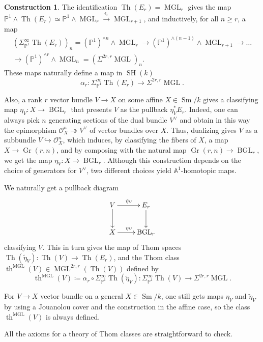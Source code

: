 \documentclass[10pt]{amsart}
\theoremstyle{definition}
\newtheorem{constr}[defn]{Construction}
\theoremstyle{plain}
\numberwithin{equation}{section}
\newcommand{\0}{\emptyset}
\newcommand{\A}{{\mathbb A}}
\renewcommand{\P}{{\mathbb P}}
\newcommand{\MGL}{{\operatorname{MGL}}}
\newcommand{\BGL}{{\operatorname{BGL}}}
\newcommand{\Gr}{{\operatorname{Gr}}}
\newcommand{\SH}{{\operatorname{SH}}}
\newcommand{\Th}{{\operatorname{Th}}}
\newcommand{\Sm}{{\operatorname{Sm}}}
\renewcommand{\th}{{\operatorname{th}}}
\begin{document}
\begin{constr}
\label{constr:MGLthomclasses}
The identification $\Th(E_r) = \MGL_r$ gives the map $\P^1 \wedge \Th(E_r) \simeq \P^1 \wedge \MGL_r \xrightarrow{\epsilon_r} \MGL_{r+1}$, and inductively, for all $n \ge r$, a map
\begin{multline*}
    (\Sigma_{\P^1}^\infty \Th(E_r))_n= (\P^1)^{\wedge n} \wedge \MGL_r \to (\P^1)^{\wedge (n-1)}\wedge \MGL_{r+1} \to \ldots \\ \to (\P^1)^{\wedge r} \wedge \MGL_n= (\Sigma^{2r,r}\MGL)_n.
\end{multline*}
These maps naturally define a map in $\SH(k)$
\begin{equation}
\label{eq:universalmapsMGL}
    \alpha_r: \Sigma_{\P^1}^\infty\Th(E_r)\to \Sigma^{2r,r}\MGL.
\end{equation}

Also, a rank $r$ vector bundle $V\to X$ on  some affine $X\in \Sm/k$ gives a classifying map $\eta_V:X\to \BGL_r$ that presents $V$ as the pullback $\eta_V^* E_r$. Indeed, one can always pick $n$ generating sections of the dual bundle $V^\vee$ and obtain in this way the epimorphism $\mathcal{O}_X^n \twoheadrightarrow V^\vee$ of vector bundles over $X$. Thus, dualizing gives $V$ as a subbundle $V \hookrightarrow \mathcal{O}_X^n$, which induces, by classifying the fibers of $X$, a map $X \to \Gr(r,n)$, and by composing with the natural map $\Gr(r,n) \to \BGL_r$, we get the map $\eta_V:X \to \BGL_r$. Although this construction depends on the choice of generators for $V^\vee$, two different choices yield $\A^1$-homotopic maps.

We naturally get a pullback diagram
\[
\xymatrix{
V\ar[r]^{\tilde{\eta}_V}\ar[d]&E_r\ar[d]\\
X\ar[r]^{\eta_V}&\BGL_r
}
\]
classifying $V$. This in turn gives the map of Thom spaces $\Th(\tilde{\eta}_V):\Th(V)\to \Th(E_r)$, and the Thom class $\th^\MGL(V) \in \MGL^{2r,r}(\Th(V))$ defined by
\begin{equation}
    \label{eq:MGLThomclasses}
    \th^\MGL(V) \coloneqq \alpha_r \circ \Sigma_{\P^1}^\infty \Th(\tilde{\eta}_V):\Sigma^\infty_{\P^1}\Th(V)\to  \Sigma^{2r,r}\MGL.
\end{equation}

For $V\to X$ vector bundle on a general $X\in \Sm/k$, one still gets maps $\eta_V$ and $\tilde{\eta}_V$ by using a Jouanolou cover and the construction in the affine case, so the class $\th^{\MGL}(V)$ is always defined.

All the axioms for a theory of Thom classes are straightforward to check.
\end{constr}
\end{document}
